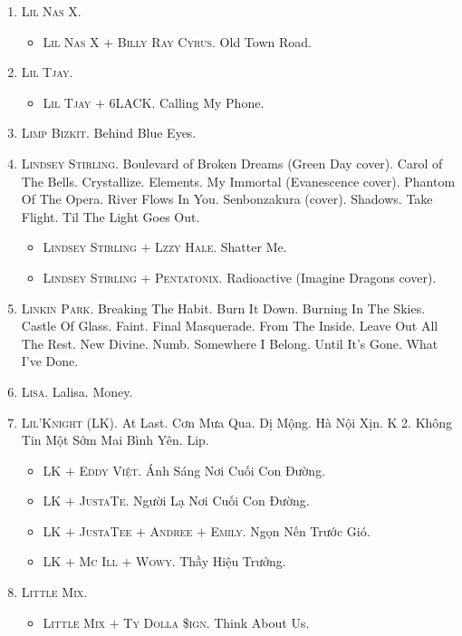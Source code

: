 \documentclass{article}
\begin{document}
\begin{enumerate}
	\item \textsc{Lil Nas X.}
	\begin{itemize}
		\item \textsc{Lil Nas X $+$ Billy Ray Cyrus.} Old Town Road.
	\end{itemize}
	\item \textsc{Lil Tjay.}
	\begin{itemize}
		\item \textsc{Lil Tjay $+$ 6LACK.} Calling My Phone.
	\end{itemize}
	\item \textsc{Limp Bizkit.} Behind Blue Eyes.
	\item \textsc{Lindsey Stirling.} Boulevard of Broken Dreams (Green Day cover). Carol of The Bells. Crystallize. Elements. My Immortal (Evanescence cover). Phantom Of The Opera. River Flows In You. Senbonzakura (cover). Shadows. Take Flight. Til The Light Goes Out.
	\begin{itemize}
		\item \textsc{Lindsey Stirling $+$ Lzzy Hale.} Shatter Me.
		\item \textsc{Lindsey Stirling $+$ Pentatonix.} Radioactive (Imagine Dragons cover).
	\end{itemize}
	\item \textsc{Linkin Park.} Breaking The Habit. Burn It Down. Burning In The Skies. Castle Of Glass. Faint. Final Masquerade. From The Inside. Leave Out All The Rest. New Divine. Numb. Somewhere I Belong. Until It's Gone. What I've Done.
	\item \textsc{Lisa.} Lalisa. Money.
	\item \textsc{Lil'Knight (LK).} At Last. Cơn Mưa Qua. Dị Mộng. Hà Nội Xịn. K 2. Không Tin Một Sớm Mai Bình Yên. Lip.
	\begin{itemize}
		\item \textsc{LK $+$ Eddy Việt.} Ánh Sáng Nơi Cuối Con Đường.
		\item \textsc{LK $+$ JustaTe.} Người Lạ Nơi Cuối Con Đường.
		\item \textsc{LK $+$ JustaTee $+$ Andree $+$ Emily.} Ngọn Nến Trước Gió.
		\item \textsc{LK $+$ Mc Ill $+$ Wowy.} Thầy Hiệu Trưởng.
	\end{itemize}
	\item \textsc{Little Mix.}
	\begin{itemize}
		\item \textsc{Little Mix $+$ Ty Dolla \$ign.} Think About Us.
	\end{itemize}

\end{enumerate}
\end{document}
